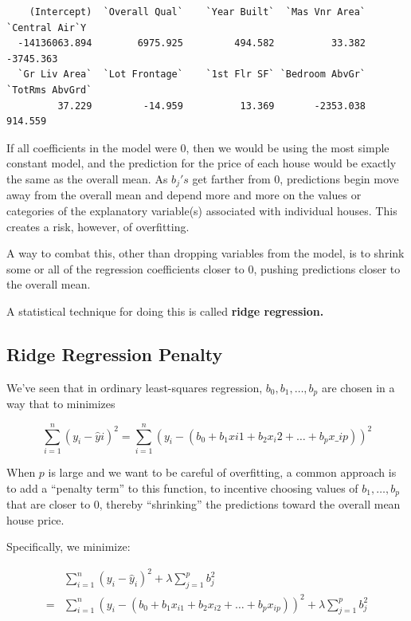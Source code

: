 \documentclass[
  letterpaper,
  DIV=11,
  numbers=noendperiod]{scrreprt}
\begin{document}
\begin{verbatim}
    (Intercept)  `Overall Qual`    `Year Built`  `Mas Vnr Area`  `Central Air`Y 
  -14136063.894        6975.925         494.582          33.382       -3745.363 
  `Gr Liv Area`  `Lot Frontage`    `1st Flr SF` `Bedroom AbvGr` `TotRms AbvGrd` 
         37.229         -14.959          13.369       -2353.038         914.559 
\end{verbatim}

If all coefficients in the model were 0, then we would be using the most
simple constant model, and the prediction for the price of each house
would be exactly the same as the overall mean. As \(b_j's\) get farther
from 0, predictions begin move away from the overall mean and depend
more and more on the values or categories of the explanatory variable(s)
associated with individual houses. This creates a risk, however, of
overfitting.

A way to combat this, other than dropping variables from the model, is
to shrink some or all of the regression coefficients closer to 0,
pushing predictions closer to the overall mean.

A statistical technique for doing this is called \textbf{ridge
regression.}

\subsection{Ridge Regression Penalty}\label{ridge-regression-penalty}

We've seen that in ordinary least-squares regression,
\(b_0, b_1, \ldots, b_p\) are chosen in a way that to minimizes

\[
\displaystyle\sum_{i=1}^n (y_i -\hat{y}i)^2 =\displaystyle\sum_{i=1}^{n} (y_i -(b_0 + b_1x{i1} + b_2{x_i2} + \ldots +b_px\_{ip}))^2
\]

When \(p\) is large and we want to be careful of overfitting, a common
approach is to add a ``penalty term'' to this function, to incentive
choosing values of \(b_1, \ldots, b_p\) that are closer to 0, thereby
``shrinking'' the predictions toward the overall mean house price.

Specifically, we minimize:

\[
\begin{aligned}
& \displaystyle\sum_{i=1}^n (y_i -\hat{y}_i)^2  + \lambda\displaystyle\sum_{j=1}^pb_j^2\\ =  & \displaystyle\sum_{i=1}^n (y_i -(b_0 + b_1x_{i1} + b_2x_{i2} + \ldots + b_px_{ip}))^2 + \lambda\displaystyle\sum_{j=1}^pb_j^2
\end{aligned}
\]
\end{document}
